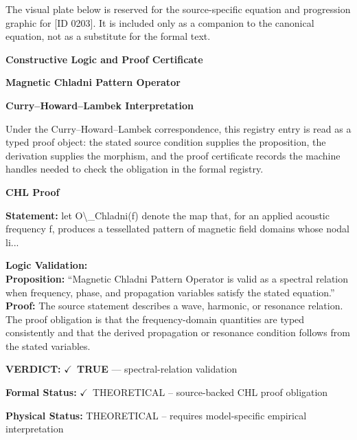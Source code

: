\begingroup\footnotesize\sloppy
The visual plate below is reserved for the source-specific equation and progression graphic for [ID 0203]. It is included only as a companion to the canonical equation, not as a substitute for the formal text.
\par\endgroup
\ifTZPDarkEdition
{}
\fi

\clearpage
\begingroup\tzpsupportsetup
\noindent\textbf{\fontsize{10.8pt}{12.8pt}\selectfont [ID 0203] Constructive Logic and Proof Certificate}\par
\noindent\textbf{\fontsize{10pt}{12pt}\selectfont Magnetic Chladni Pattern Operator}\par
\vspace{0.45em}
\begingroup
\footnotesize
\setlength{\parskip}{0.22em}
\setlength{\parindent}{0pt}
\noindent\textbf{Curry--Howard--Lambek Interpretation}\par
Under the Curry--Howard--Lambek correspondence, this registry entry is read as a typed proof
object: the stated source condition supplies the proposition, the derivation supplies the
morphism, and the proof certificate records the machine handles needed to check the obligation
in the formal registry.

\vspace{0.45em}
\noindent\textbf{CHL Proof}\par
\textbf{Statement:} let O\textbackslash{}\_Chladni(f) denote the map that, for an applied acoustic frequency f, produces a
tessellated pattern of magnetic field domains whose nodal li...

\textbf{Logic Validation:}\\
\textbf{Proposition:} ``Magnetic Chladni Pattern Operator is valid as a spectral relation when frequency, phase,
and propagation variables satisfy the stated equation.''\\
\textbf{Proof:} The source statement describes a wave, harmonic, or resonance relation. The proof
obligation is that the frequency-domain quantities are typed consistently and that the
derived propagation or resonance condition follows from the stated variables.

\textbf{VERDICT:} \ensuremath{\checkmark}\ \textbf{TRUE} --- spectral-relation validation

\textbf{Formal Status:} \ensuremath{\checkmark}\ THEORETICAL -- source-backed CHL proof obligation

\textbf{Physical Status:} THEORETICAL -- requires model-specific empirical interpretation
\par\vspace{0.45em}
\par
\ifTZPDarkEdition
{}
\fi
\endgroup
\endgroup
